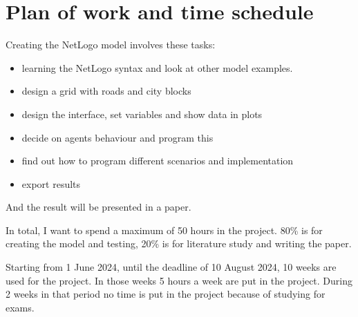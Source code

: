 \documentclass{article}
\begin{document}
    \section{Plan of work and time schedule}

    Creating the NetLogo model involves these tasks:
    \begin{itemize}
        \item learning the NetLogo syntax and look at other model examples.
        \item design a grid with roads and city blocks
        \item design the interface, set variables and show data in plots
        \item decide on agents behaviour and program this
        \item find out how to program different scenarios and implementation
        \item export results
    \end{itemize}

    And the result will be presented in a paper.

    In total, I want to spend a maximum of 50 hours in the project.
    80\% is for creating the model and testing, 20\% is for literature study and writing the paper.

    Starting from 1 June 2024, until the deadline of 10 August 2024, 10 weeks are used for the project.
    In those weeks 5 hours a week are put in the project.
    During 2 weeks in that period no time is put in the project because of studying for exams.

    

    
\end{document}
